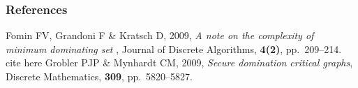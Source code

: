 %
%

\begin{frame} \frametitle{References}
\begin{thebibliography}{xx}\footnotesize

 {\sc Fomin FV, Grandoni F \& Kratsch D}, 2009, {\em A note on the complexity of minimum dominating set }, Journal of Discrete Algorithms, {\bf{4(2)}}, pp.\ 209--214.
cite here
 {\sc Grobler PJP \& Mynhardt CM}, 2009, {\em Secure domination critical graphs}, Discrete Mathematics, {\bf 309}, pp.~5820--5827.


\end{thebibliography}
\end{frame}